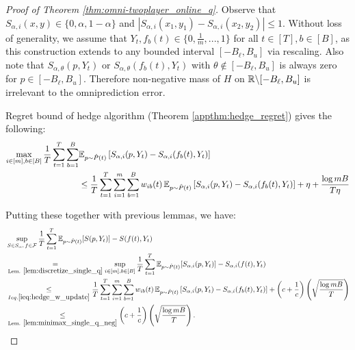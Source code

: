 \begin{proof}[Proof of Theorem \ref{thm:omni-twoplayer_online_q}]
Observe that $S_{\alpha, i}(x,y) \in \{0, \alpha, 1-\alpha\}$ and $|S_{\alpha, i}(x_1,y_1) - S_{\alpha, i}(x_2,y_2)| \leq 1$. Without loss of generality, we assume that $Y_t, f_b(t) \in \{0, \frac{1}{m}, ..., 1\}$ for all $t \in [T], b \in [B]$, as this construction extends to any bounded interval $[-B_\ell, B_u]$ via rescaling. Also note that $S_{\alpha, \theta}(p, Y_t)$ or $S_{\alpha, \theta}(f_b(t), Y_t)$ with $\theta \notin [-B_\ell, B_u]$ is always zero for $p \in [-B_\ell, B_u]$. Therefore non-negative mass of $H$ on $\mathbb{R} \backslash [-B_\ell, B_u]$ is irrelevant to the omniprediction error.

Regret bound of hedge algorithm (Theorem \ref{appthm:hedge_regret}) gives the following:
\begin{align}
  \max_{i \in [m], b \in [B]} \frac{1}{T} \sum_{t=1}^T \sum_{b=1}^B 
  & \mathbb{E}_{p\sim \hat{P}(t)}\left[ S_{\alpha, i}(p, Y_t) - S_{\alpha, i}(f_b(t), Y_t) \right] \nonumber\\
  & \leq \frac{1}{T} \sum_{t=1}^T \sum_{i=1}^{m} \sum_{b=1}^B w_{ib}(t) \, \mathbb{E}_{p\sim \hat{P}(t)}\left[ S_{\alpha, i}(p, Y_t) - S_{\alpha, i}(f_b(t), Y_t) \right] + \eta + \frac{\log mB}{T\eta} \label{ieq:hedge_w_update}
\end{align}

Putting these together with previous lemmas, we have:
\begin{align*}
  & \sup_{S \in S_\alpha,\, f \in \mathcal{F}} \frac{1}{T} \sum_{t=1}^T \mathbb{E}_{p \sim \hat{P}(t)} [S(p, Y_t)] - S(f(t), Y_t) \\
  & \underset{\text{Lem. } \ref{lem:discretize_single_q}}{=} \sup_{i \in [m], b \in [B]} \frac{1}{T} \sum_{t=1}^T \mathbb{E}_{p \sim \hat{P}(t)} [S_{\alpha, i}(p, Y_t)] - S_{\alpha, i}(f(t), Y_t) \\
  & \underset{Ieq. \eqref{ieq:hedge_w_update}}{\leq} \frac{1}{T} \sum_{t=1}^T \sum_{i=1}^{m} \sum_{b=1}^B w_{ib}(t) \, \mathbb{E}_{p\sim \hat{P}(t)}\left[ S_{\alpha, i}(p, Y_t) - S_{\alpha, i}(f_b(t), Y_t) \right] + \left(c+\frac{1}{c}\right)\left(\sqrt{\frac{\log mB}{T}}\right) \\
  & \underset{\text{Lem. } \ref{lem:minimax_single_q_neg}}{\leq} \left(c+\frac{1}{c}\right)\left(\sqrt{\frac{\log mB}{T}}\right).
\end{align*}
\end{proof} 





